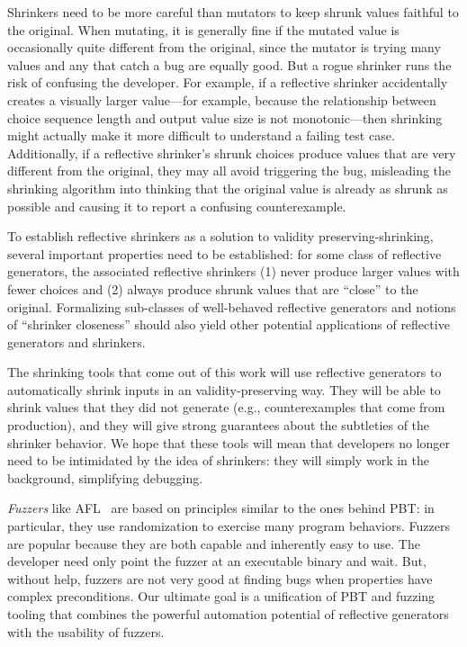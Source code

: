 Shrinkers need to be more careful than mutators to keep shrunk values faithful
to the original. When mutating, it is generally fine if the mutated value is
occasionally quite different from the original, since the mutator is
trying many values and any that catch a bug are equally good. But a rogue
shrinker runs the risk of confusing the developer. For example, if a
reflective shrinker accidentally creates a visually larger
value---for example, because the relationship between choice sequence length and
output value size is not monotonic---then shrinking might actually make it more
difficult to understand a failing test case. Additionally, if a
reflective shrinker's shrunk choices
produce values that are very different from the original, they may all
avoid triggering the bug, misleading the shrinking algorithm into thinking that
the original value is already as shrunk as possible and causing it to
report a confusing counterexample.

To establish reflective shrinkers as a solution to
validity preserving-shrinking, several important
properties need to be established: for some class of reflective
generators, the associated reflective shrinkers (1) never produce larger values
with fewer choices and (2) always produce shrunk values that are ``close'' to
the original. Formalizing sub-classes of well-behaved reflective generators and
notions of ``shrinker closeness'' should also yield
other potential applications of reflective generators and shrinkers.

The shrinking tools that come out of this work will use reflective generators to
automatically shrink inputs in an validity-preserving way. They will be able to
shrink values that they did not generate (e.g., counterexamples that come from
production), and they will give strong guarantees about the subtleties of the
shrinker behavior. We hope that these tools will mean that developers no longer
need to be intimidated by the idea of shrinkers: they will simply work in the
background, simplifying debugging.

{\em Fuzzers} like AFL~\cite{afl-readme} are based on principles
similar to the
ones behind PBT: in particular, they use randomization to exercise many
program behaviors. Fuzzers are popular because they are both capable and
inherently easy to use. The developer need only point the fuzzer at an
executable binary and
wait. But, without help, fuzzers are not very good at finding
bugs when properties have complex preconditions.
Our ultimate goal is a unification of PBT and fuzzing tooling that combines the
powerful automation potential of reflective generators with the usability of
fuzzers.

